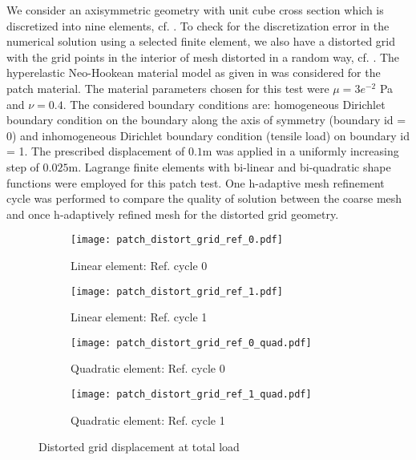 We consider an axisymmetric geometry with unit cube cross section which is discretized into nine elements, cf. . To check for the discretization error in the numerical solution using a selected finite element, we also have a distorted grid with the grid points in the interior of mesh distorted in a random way, cf. . The hyperelastic Neo-Hookean material model as given in  was considered for the patch material. The material parameters chosen for this test were $\mu = 3e^{-2}$ Pa and $\nu = 0.4$. The considered boundary conditions are: homogeneous Dirichlet boundary condition on the boundary along the axis of symmetry (boundary id = 0) and inhomogeneous Dirichlet boundary condition (tensile load) on boundary id = 1. The prescribed displacement of $0.1 $m was applied in a uniformly increasing step of $0.025 $m. Lagrange finite elements with bi-linear and bi-quadratic shape functions were employed for this patch test. One h-adaptive mesh refinement cycle was performed to compare the quality of solution between the coarse mesh and once h-adaptively refined mesh for the distorted grid geometry. \par 

\begin{figure}[h!]
\centering
\begin{subfigure}[b]{0.35\textwidth}
\centering
\texttt{[image: patch\_distort\_grid\_ref\_0.pdf]}
\caption{Linear element: Ref. cycle 0}
\label{fig:2.2.1}
\end{subfigure}
\begin{subfigure}[b]{0.35\textwidth}
\centering
\texttt{[image: patch\_distort\_grid\_ref\_1.pdf]}
\caption{Linear element: Ref. cycle 1}
\label{fig:2.2.2}
\end{subfigure}
\begin{subfigure}[b]{0.35\textwidth}
\centering
\texttt{[image: patch\_distort\_grid\_ref\_0\_quad.pdf]}
\caption{Quadratic element: Ref. cycle 0}
\label{fig:2.2.3}
\end{subfigure}
\begin{subfigure}[b]{0.35\textwidth}
\centering
\texttt{[image: patch\_distort\_grid\_ref\_1\_quad.pdf]}
\caption{Quadratic element: Ref. cycle 1}
\label{fig:2.2.4}
\end{subfigure}
\caption{Distorted grid displacement at total load}
\label{fig:2.2}
\end{figure}

